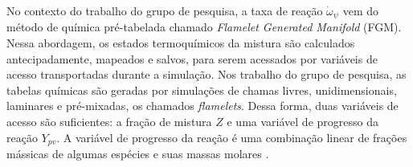 No contexto do trabalho do grupo de pesquisa, a taxa de reação $\dot \omega_\psi$ vem do método de química pré-tabelada chamado \emph{Flamelet Generated Manifold} (FGM).
Nessa abordagem, os estados termoquímicos da mistura são calculados antecipadamente, mapeados e salvos, para serem acessados por variáveis de acesso transportadas durante a simulação.
Nos trabalho do grupo de pesquisa, as tabelas químicas são geradas por simulações de chamas livres, unidimensionais, laminares e pré-mixadas, os chamados \emph{flamelets}.
Dessa forma, duas variáveis de acesso são suficientes: a fração de mistura $Z$ e uma variável de progresso da reação $Y_{pv}$.
A variável de progresso da reação é uma combinação linear de frações mássicas de algumas espécies e suas massas molares \cite{SacomanoF2018CTM}.











